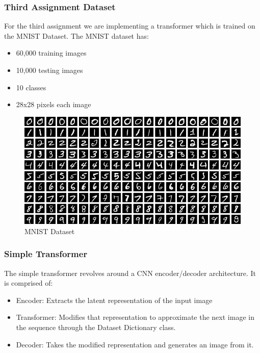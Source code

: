 \begin{frame}
    \frametitle{Third Assignment Dataset}
    For the third assignment we are implementing a transformer which is 
    trained on the MNIST Dataset. The MNIST dataset has:
    \begin{itemize}
        \item 60,000 training images
        \item 10,000 testing images
        \item 10 classes
        \item 28x28 pixels each image
    \end{itemize}
    \begin{figure}
        \centering
        \includegraphics[height=0.4\textheight]{media/3rdAssignment/MNIST_dataset_example.png}
        \vspace{-0.35cm}
        \caption{MNIST Dataset}
    \end{figure}
\end{frame}

\begin{frame}
    \frametitle{Simple Transformer}
    The simple transformer revolves around a CNN encoder/decoder architecture. 
    It is comprised of:
    \begin{itemize}
        \item Encoder: Extracts the latent representation of the input image
        \item Transformer: Modifies that representation to approximate the next
        image in the sequence through the Dataset Dictionary class.
        \item Decoder: Takes the modified representation and generates an image
        from it.
    \end{itemize}
\end{frame}

